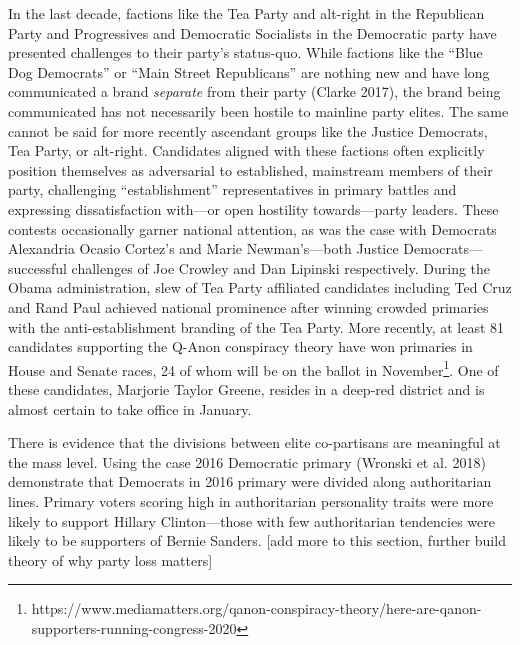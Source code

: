 \documentclass[
  12,
]{paper}
\begin{document}
In the last decade, factions like the Tea Party and alt-right in the
Republican Party and Progressives and Democratic Socialists in the
Democratic party have presented challenges to their party's status-quo.
While factions like the ``Blue Dog Democrats'' or ``Main Street
Republicans'' are nothing new and have long communicated a brand
\emph{separate} from their party (Clarke 2017), the brand being
communicated has not necessarily been hostile to mainline party elites.
The same cannot be said for more recently ascendant groups like the
Justice Democrats, Tea Party, or alt-right. Candidates aligned with
these factions often explicitly position themselves as adversarial to
established, mainstream members of their party, challenging
``establishment'' representatives in primary battles and expressing
dissatisfaction with---or open hostility towards---party leaders. These
contests occasionally garner national attention, as was the case with
Democrats Alexandria Ocasio Cortez's and Marie Newman's---both Justice
Democrats---successful challenges of Joe Crowley and Dan Lipinski
respectively. During the Obama administration, slew of Tea Party
affiliated candidates including Ted Cruz and Rand Paul achieved national
prominence after winning crowded primaries with the anti-establishment
branding of the Tea Party. More recently, at least 81 candidates
supporting the Q-Anon conspiracy theory have won primaries in House and
Senate races, 24 of whom will be on the ballot in
November\footnote{https://www.mediamatters.org/qanon-conspiracy-theory/here-are-qanon-supporters-running-congress-2020}.
One of these candidates, Marjorie Taylor Greene, resides in a deep-red
district and is almost certain to take office in January.

There is evidence that the divisions between elite co-partisans are
meaningful at the mass level. Using the case 2016 Democratic primary
(Wronski et al. 2018) demonstrate that Democrats in 2016 primary were
divided along authoritarian lines. Primary voters scoring high in
authoritarian personality traits were more likely to support Hillary
Clinton---those with few authoritarian tendencies were likely to be
supporters of Bernie Sanders. {[}add more to this section, further build
theory of why party loss matters{]}
\end{document}

